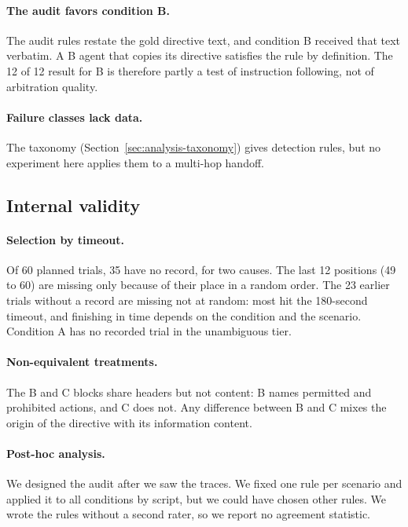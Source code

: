 \paragraph{The audit favors condition B.} The audit rules restate the gold directive text, and condition B received that text verbatim. A B agent that copies its directive satisfies the rule by definition. The 12 of 12 result for B is therefore partly a test of instruction following, not of arbitration quality.

\paragraph{Failure classes lack data.} The taxonomy (Section~\ref{sec:analysis-taxonomy}) gives detection rules, but no experiment here applies them to a multi-hop handoff.

\subsection{Internal validity}
\paragraph{Selection by timeout.} Of 60 planned trials, 35 have no record, for two causes. The last 12 positions (49 to 60) are missing only because of their place in a random order. The 23 earlier trials without a record are missing not at random: most hit the 180-second timeout, and finishing in time depends on the condition and the scenario. Condition A has no recorded trial in the unambiguous tier.

\paragraph{Non-equivalent treatments.} The B and C blocks share headers but not content: B names permitted and prohibited actions, and C does not. Any difference between B and C mixes the origin of the directive with its information content.

\paragraph{Post-hoc analysis.} We designed the audit after we saw the traces. We fixed one rule per scenario and applied it to all conditions by script, but we could have chosen other rules. We wrote the rules without a second rater, so we report no agreement statistic.

